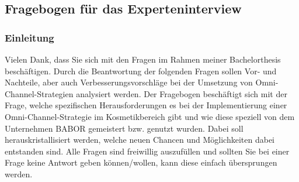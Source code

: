 \subsection*{Fragebogen für das Experteninterview}

\subsubsection*{Einleitung}
Vielen Dank, dass Sie sich mit den Fragen im Rahmen meiner Bachelorthesis beschäftigen. Durch die Beantwortung der folgenden Fragen sollen Vor- und Nachteile, aber auch Verbesserungsvorschläge bei der Umsetzung von Omni-Channel-Strategien analysiert werden. Der Fragebogen beschäftigt sich mit der Frage, welche spezifischen Herausforderungen es bei der Implementierung einer Omni-Channel-Strategie im Kosmetikbereich gibt und wie diese speziell von dem Unternehmen BABOR gemeistert bzw. genutzt wurden. Dabei soll herauskristallisiert werden, welche neuen Chancen und Möglichkeiten dabei entstanden sind. Alle Fragen sind freiwillig auszufüllen und sollten Sie bei einer Frage keine Antwort geben können/wollen, kann diese einfach übersprungen werden.

